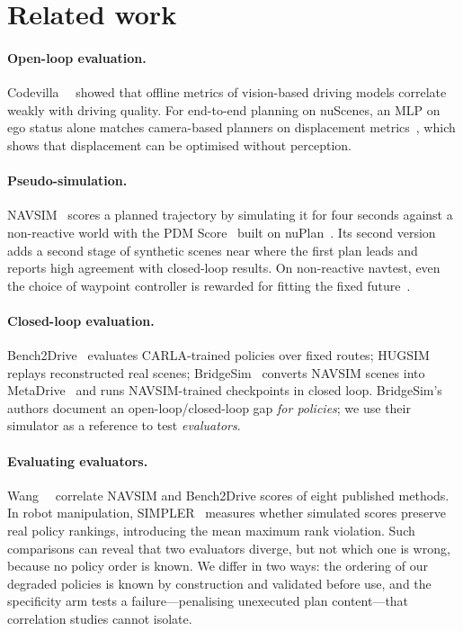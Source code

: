 \section{Related work}
\label{sec:related}

\paragraph{Open-loop evaluation.}
Codevilla~\etal~\cite{codevilla2018offline} showed that offline metrics of vision-based driving
models correlate weakly with driving quality.
For end-to-end planning on nuScenes, an MLP on ego status alone matches camera-based planners on
displacement metrics~\cite{zhai2023admlp,li2024egostatus}, which shows that displacement can be
optimised without perception.

\paragraph{Pseudo-simulation.}
NAVSIM~\cite{dauner2024navsim} scores a planned trajectory by simulating it for four seconds
against a non-reactive world with the PDM Score~\cite{dauner2023pdm} built on nuPlan~\cite{caesar2021nuplan}.
Its second version~\cite{cao2025pseudosim} adds a second stage of synthetic scenes near where the
first plan leads and reports high agreement with closed-loop results.
On non-reactive navtest, even the choice of waypoint controller is rewarded for fitting the fixed
future~\cite{rodriguez2026waypoint}.

\paragraph{Closed-loop evaluation.}
Bench2Drive~\cite{jia2024bench2drive} evaluates CARLA-trained policies over fixed routes;
HUGSIM~\cite{zhou2024hugsim} replays reconstructed real scenes; BridgeSim~\cite{zhao2026bridgesim}
converts NAVSIM scenes into MetaDrive~\cite{li2022metadrive} and runs NAVSIM-trained checkpoints in
closed loop.
BridgeSim's authors document an open-loop/closed-loop gap \emph{for policies}; we use their simulator
as a reference to test \emph{evaluators}.

\paragraph{Evaluating evaluators.}
Wang~\etal~\cite{wang2026olcl} correlate NAVSIM and Bench2Drive scores of eight published methods.
In robot manipulation, SIMPLER~\cite{li2024simpler} measures whether simulated scores preserve real
policy rankings, introducing the mean maximum rank violation.
Such comparisons can reveal that two evaluators diverge, but not which one is wrong, because no
policy order is known.
We differ in two ways: the ordering of our degraded policies is known by construction and validated
before use, and the specificity arm tests a failure---penalising unexecuted plan content---that
correlation studies cannot isolate.
